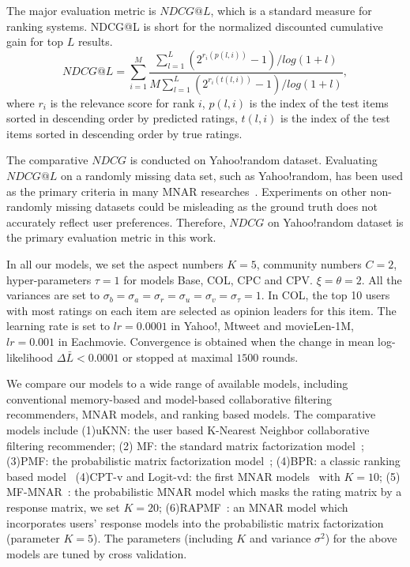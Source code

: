 \documentclass[sigconf]{acmart}
\begin{document}
The major evaluation metric is $NDCG@L$, which is a standard measure for ranking systems.   NDCG@L is short for the normalized discounted cumulative gain for top $L$ results. 
\begin{equation}
NDCG@L=\sum\limits_{i=1}^{M}\frac{\sum_{l=1}^{L}(2^{r_{i}(p(l,i))}-1)/log(1+l)}{M\sum_{l=1}^{L}(2^{r_{i}(t(l,i))}-1)/log(1+l)},
\end{equation}
where $r_i$ is the relevance score for rank $i$, $p(l,i)$ is the index of the test items sorted in descending order by predicted ratings, $t(l,i)$ is the index of the test items sorted in descending order by true ratings.

The comparative $NDCG$ is conducted on Yahoo!random dataset. Evaluating $NDCG@L$ on a randomly missing data set, such as Yahoo!random, has been used as the primary criteria in many MNAR researches~\cite{Hernandez-Lobato2014Probabilistic,Marlin2009Collaborative}. Experiments on other non-randomly missing datasets could be misleading as the ground truth does not accurately reflect user preferences. Therefore, $NDCG$ on Yahoo!random dataset is the primary evaluation metric in this work. 

In all our models, we set the aspect numbers $K=5$, community numbers $C=2$, hyper-parameters  $\tau=1$ for models Base, COL, CPC and CPV.  $\xi=\theta=2$. All the variances are set to $\sigma_b=\sigma_a=\sigma_r=\sigma_u=\sigma_v=\sigma_\tau=1$. In COL, the top 10 users with most ratings on each item are selected as opinion leaders for this item. The learning rate is set to $lr=0.0001$ in Yahoo!, Mtweet and movieLen-1M, $lr=0.001$ in Eachmovie. Convergence is obtained when the change in mean log-likelihood $\Delta\bar{L}<0.0001$ or stopped at maximal $1500$ rounds.  

We compare our models to a wide range of available models, including conventional memory-based and model-based collaborative filtering recommenders, MNAR models, and ranking based models. The comparative models include (1)uKNN: the user based K-Nearest Neighbor collaborative filtering recommender; (2) MF: the standard matrix factorization model~\cite{Koren2009Matrix}; (3)PMF: the probabilistic matrix factorization model~\cite{salakhutdinov2008probabilistic}; (4)BPR: a classic ranking based model~\cite{Rendle2009BPR} (4)CPT-v and Logit-vd: the first MNAR models~\cite{Marlin2009Collaborative} with $K=10$; (5) MF-MNAR~\cite{Hernandez-Lobato2014Probabilistic}: the probabilistic MNAR model which masks the rating matrix by a response matrix, we set $K=20$; (6)RAPMF~\cite{Yang2015Boosting}: an MNAR model which incorporates users' response models into the probabilistic matrix factorization (parameter $K=5$). The parameters (including $K$ and variance $\sigma^2$) for the above models are tuned by cross validation.
\end{document}
